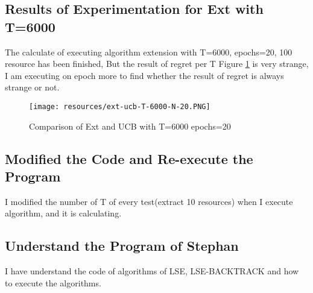 \subsection*{Results of Experimentation for Ext with T=6000}
The calculate of executing algorithm extension with T=6000, epochs=20, 100 resource has been finished, But the result of regret per T Figure \ref{comparisonExtUCB6000} is very strange, I am executing on epoch more to find whether the result of regret is always strange or not.

\begin{figure}[H]
    \center
    \texttt{[image: resources/ext-ucb-T-6000-N-20.PNG]}
	\caption{Comparison of Ext and UCB with T=6000 epochs=20}
	\label{comparisonExtUCB6000}
\end{figure}

\subsection*{Modified the Code and Re-execute the Program}
I modified the number of T of every test(extract 10 resources) when I execute algorithm, and it is calculating.

\subsection*{Understand the Program of Stephan}
I have understand the code of algorithms of LSE, LSE-BACKTRACK and how to execute the algorithms.